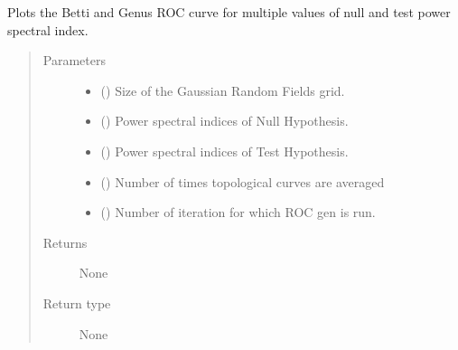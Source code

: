 \documentclass[letterpaper,10pt,english]{sphinxmanual}
\begin{document}
\begin{fulllineitems}
\label{\detokenize{testsFunc:testsFunc.testBettiGenusROC}}
\sphinxAtStartPar
Plots the Betti and Genus ROC curve for multiple values of null and test power spectral index.
\begin{quote}\begin{description}
\item[{Parameters}] \leavevmode\begin{itemize}
\item {} 
\sphinxAtStartPar
{} () \textendash{} Size of the Gaussian Random Fields grid.

\item {} 
\sphinxAtStartPar
{} () \textendash{} Power spectral indices of Null Hypothesis.

\item {} 
\sphinxAtStartPar
{} () \textendash{} Power spectral indices of Test Hypothesis.

\item {} 
\sphinxAtStartPar
{} () \textendash{} Number of times topological curves are averaged

\item {} 
\sphinxAtStartPar
{} () \textendash{} Number of iteration for which ROC gen is run.

\end{itemize}

\item[{Returns}] \leavevmode
\sphinxAtStartPar
None

\item[{Return type}] \leavevmode
\sphinxAtStartPar
None

\end{description}\end{quote}

\end{fulllineitems}
\end{document}
